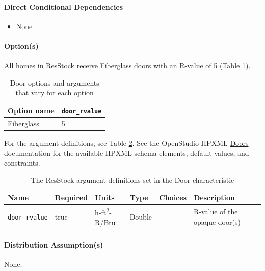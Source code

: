 \paragraph{Direct Conditional Dependencies}
 
\begin{itemize}
    \item None
\end{itemize}
\paragraph{Option(s)}
All homes in ResStock receive Fiberglass doors with an R-value of 5 (Table \ref{table:hc_opt_door}).

\begin{longtable}[]{|p{3.5cm}|p{3.3cm}|} \caption{Door options and arguments that vary for each option} \label{table:hc_opt_door} \\  

\toprule\noalign{}
Option name & \texttt{door\_rvalue} \\
\midrule\noalign{}
\endhead
\bottomrule\noalign{}
\endlastfoot
Fiberglass & 5 \\
\end{longtable}

For the argument definitions, see Table \ref{table:hc_arg_def_door}. See the OpenStudio-HPXML \href{https://openstudio-hpxml.readthedocs.io/en/v1.8.1/workflow_inputs.html#hpxml-doors}{Doors} documentation for the available HPXML schema elements, default values, and constraints.

\begin{longtable}[]{|p{3.5cm}|p{1.5cm}|p{1.3cm}|p{1.1cm}|p{}|p{3.3cm}|} \caption{The ResStock argument definitions set in the Door characteristic} \label{table:hc_arg_def_door} \\\toprule\noalign{}
Name & Required & Units & Type & Choices & Description \\
\midrule\noalign{}
\endhead
\bottomrule\noalign{}
\endlastfoot
\texttt{door\_rvalue} & true & h-ft\textsuperscript{2}-R/Btu & Double & & R-value of
the opaque door(s) \\
\end{longtable}

\paragraph{Distribution Assumption(s)}
None.



